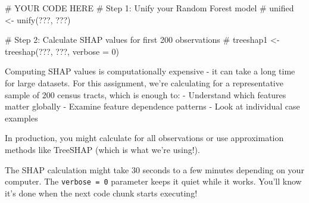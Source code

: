 \documentclass[
  letterpaper,
  DIV=11,
  numbers=noendperiod]{scrartcl}
\newenvironment{Shaded}{\begin{snugshade}}{\end{snugshade}}
\newcommand{\CommentTok}[1]{\textcolor[rgb]{0.37,0.37,0.37}{#1}}
\begin{document}
\begin{Shaded}
\begin{Highlighting}[]
\CommentTok{\# YOUR CODE HERE}
\CommentTok{\# Step 1: Unify your Random Forest model}
\CommentTok{\# unified \textless{}{-} unify(???, ???)}

\CommentTok{\# Step 2: Calculate SHAP values for first 200 observations}
\CommentTok{\# treeshap1 \textless{}{-} treeshap(???, ???, verbose = 0)}
\end{Highlighting}
\end{Shaded}

\begin{tcolorbox}[enhanced jigsaw, title=\textcolor{quarto-callout-note-color}{\faInfo}\hspace{0.5em}{💭 Why Only 200 Observations?}, titlerule=0mm, coltitle=black, colbacktitle=quarto-callout-note-color!10!white, colback=white, left=2mm, toprule=.15mm, opacitybacktitle=0.6, toptitle=1mm, colframe=quarto-callout-note-color-frame, bottomtitle=1mm, arc=.35mm, bottomrule=.15mm, breakable, leftrule=.75mm, opacityback=0, rightrule=.15mm]

Computing SHAP values is computationally expensive - it can take a long
time for large datasets. For this assignment, we're calculating for a
representative sample of 200 census tracts, which is enough to: -
Understand which features matter globally - Examine feature dependence
patterns - Look at individual case examples

In production, you might calculate for all observations or use
approximation methods like TreeSHAP (which is what we're using!).

\end{tcolorbox}

\begin{tcolorbox}[enhanced jigsaw, title=\textcolor{quarto-callout-tip-color}{\faLightbulb}\hspace{0.5em}{⚠️ Patience Required!}, titlerule=0mm, coltitle=black, colbacktitle=quarto-callout-tip-color!10!white, colback=white, left=2mm, toprule=.15mm, opacitybacktitle=0.6, toptitle=1mm, colframe=quarto-callout-tip-color-frame, bottomtitle=1mm, arc=.35mm, bottomrule=.15mm, breakable, leftrule=.75mm, opacityback=0, rightrule=.15mm]

The SHAP calculation might take 30 seconds to a few minutes depending on
your computer. The \texttt{verbose\ =\ 0} parameter keeps it quiet while
it works. You'll know it's done when the next code chunk starts
executing!

\end{tcolorbox}
\end{document}
